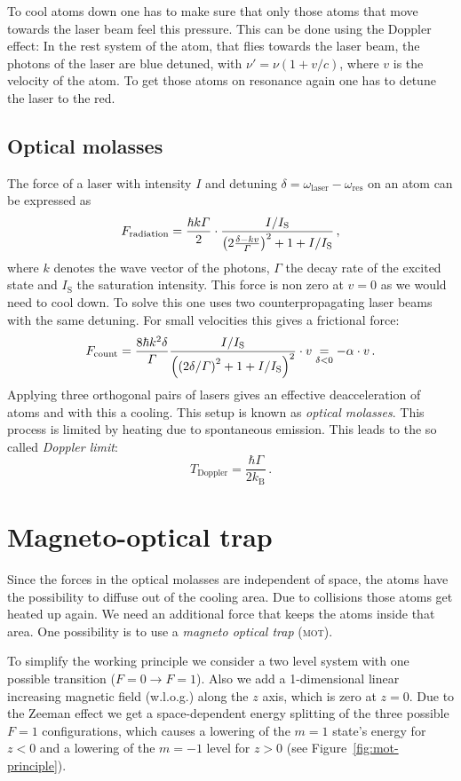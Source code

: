 \documentclass[11pt, english, fleqn, DIV=15, headinclude, BCOR=2cm]{scrreprt}
\newcommand\mot{\textsc{mot}}
\begin{document}
To cool atoms down one has to make sure that only those atoms that move
towards the laser beam feel this pressure. This can be done using the Doppler
effect: In the rest system of the atom, that flies towards the laser beam, the
photons of the laser are blue detuned, with $\nu'=\nu(1+v/c)$, where $v$ is
the velocity of the atom. To get those atoms on resonance again one has to
detune the laser to the red.

\subsection{Optical molasses}

The force of a laser with intensity $I$ and detuning $\delta =
\omega_\text{laser}-\omega_\text{res}$ on an atom can be expressed as
\[
    F_\text{radiation} = \frac{\hbar k\Gamma}2\cdot\frac{I/I_\text{S}}{\left( 2\frac{\delta -
    kv}\Gamma \right)^2 + 1 + I/I_\text{S}}\, ,
\]
where $k$ denotes the wave vector of the photons, $\Gamma$ the decay rate of the
excited state and $I_\text{S}$ the saturation intensity. This force is non zero
at $v=0$ as we would need to cool down. To solve this one uses two
counterpropagating laser beams with the same detuning. For small velocities
this gives a frictional force:
\[
    F_\text{count} = \frac{8\hbar k^2\delta}{\Gamma}
    \frac{I/I_\text{S}}{\left( \left( 2\delta/\Gamma \right)^2 + 1 + I/I_\text{S} \right)^2}
    \cdot v \underset{\delta<0}{=} -\alpha\cdot v \, .
\]
Applying three orthogonal pairs of lasers gives an effective deacceleration of
atoms and with this a cooling. This setup is known as \emph{optical molasses}.
This process is limited by heating due to spontaneous emission. This leads to
the so called \emph{Doppler limit}:
\[
    T_\text{Doppler} = \frac{\hbar \Gamma}{2k_\text{B}} \, .
\]

\section{Magneto-optical trap}

Since the forces in the optical molasses are independent of space, the atoms
have the possibility to diffuse out of the cooling area. Due to collisions
those atoms get heated up again. We need an additional force that keeps the
atoms inside that area. One possibility is to use a \emph{magneto optical trap}
(\mot).

To simplify the working principle we consider a two level system with one
possible transition ($F=0 \to F=1$). Also we add a 1-dimensional linear
increasing magnetic field (w.l.o.g.) along the $z$ axis, which is zero at
$z=0$. Due to the Zeeman effect we get a space-dependent energy splitting of
the three possible $F=1$ configurations, which causes a lowering of the $m=1$
state's energy for $z<0$ and a lowering of the $m=-1$ level for $z>0$ (see
Figure~\ref{fig:mot-principle}).
\end{document}
